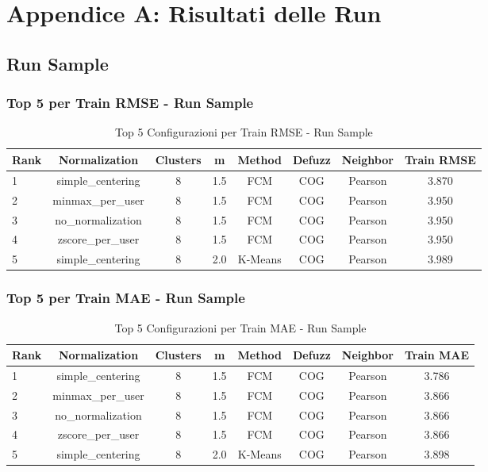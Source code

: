 \chapter{Appendice A: Risultati delle Run}
\label{chap:app1}

\section{Run Sample}

\subsection{Top 5 per Train RMSE - Run Sample}
\begin{table}[h]
    \centering
    \caption{Top 5 Configurazioni per Train RMSE - Run Sample}
    \begin{tabular}{|l|c|c|c|c|c|c|c|}
    \hline
    \textbf{Rank} & \textbf{Normalization} & \textbf{Clusters} & \textbf{m} & \textbf{Method} & \textbf{Defuzz} & \textbf{Neighbor} & \textbf{Train RMSE} \\
    \hline
    1 & simple\_centering & 8 & 1.5 & FCM & COG & Pearson & 3.870 \\
    2 & minmax\_per\_user & 8 & 1.5 & FCM & COG & Pearson & 3.950 \\
    3 & no\_normalization & 8 & 1.5 & FCM & COG & Pearson & 3.950 \\
    4 & zscore\_per\_user & 8 & 1.5 & FCM & COG & Pearson & 3.950 \\
    5 & simple\_centering & 8 & 2.0 & K-Means & COG & Pearson & 3.989 \\
    \hline
    \end{tabular}
    \end{table}

\subsection{Top 5 per Train MAE - Run Sample}
\begin{table}[h]
    \centering
    \caption{Top 5 Configurazioni per Train MAE - Run Sample}
    \begin{tabular}{|l|c|c|c|c|c|c|c|}
    \hline
    \textbf{Rank} & \textbf{Normalization} & \textbf{Clusters} & \textbf{m} & \textbf{Method} & \textbf{Defuzz} & \textbf{Neighbor} & \textbf{Train MAE} \\
    \hline
    1 & simple\_centering & 8 & 1.5 & FCM & COG & Pearson & 3.786 \\
    2 & minmax\_per\_user & 8 & 1.5 & FCM & COG & Pearson & 3.866 \\
    3 & no\_normalization & 8 & 1.5 & FCM & COG & Pearson & 3.866 \\
    4 & zscore\_per\_user & 8 & 1.5 & FCM & COG & Pearson & 3.866 \\
    5 & simple\_centering & 8 & 2.0 & K-Means & COG & Pearson & 3.898 \\
    \hline
    \end{tabular}
    \end{table}

